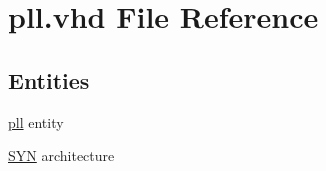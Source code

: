 \hypertarget{pll_8vhd}{}\section{pll.\+vhd File Reference}
\label{pll_8vhd}
\subsection*{Entities}
\begin{DoxyCompactItemize}
\item 
\hyperlink{classpll}{pll} entity
\item 
\hyperlink{classpll_1_1_s_y_n}{S\+Y\+N} architecture
\end{DoxyCompactItemize}
